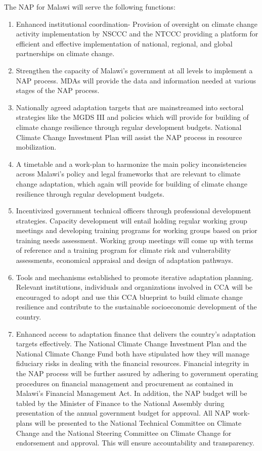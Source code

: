 \documentclass[
]{book}
\providecommand{\tightlist}{%
  \setlength{\itemsep}{0pt}\setlength{\parskip}{0pt}}
\begin{document}
The NAP for Malawi will serve the following functions:

\begin{enumerate}
\def\labelenumi{\arabic{enumi}.}
\tightlist
\item
  Enhanced institutional coordination- Provision of oversight on climate change activity implementation by NSCCC and the NTCCC providing a platform for efficient and effective implementation of national, regional, and global partnerships on climate change.
\item
  Strengthen the capacity of Malawi's government at all levels to implement a NAP process. MDAs will provide the data and information needed at various stages of the NAP process.
\item
  Nationally agreed adaptation targets that are mainstreamed into sectoral strategies like the MGDS III and policies which will provide for building of climate change resilience through regular development budgets. National Climate Change Investment Plan will assist the NAP process in resource mobilization.
\item
  A timetable and a work-plan to harmonize the main policy inconsistencies across Malawi's policy and legal frameworks that are relevant to climate change adaptation, which again will provide for building of climate change resilience through regular development budgets.
\item
  Incentivized government technical officers through professional development strategies. Capacity development will entail holding regular working group meetings and developing training programs for working groups based on prior training needs assessment. Working group meetings will come up with terms of reference and a training program for climate risk and vulnerability assessments, economical appraisal and design of adaptation pathways.
\item
  Tools and mechanisms established to promote iterative adaptation planning. Relevant institutions, individuals and organizations involved in CCA will be encouraged to adopt and use this CCA blueprint to build climate change resilience and contribute to the sustainable socioeconomic development of the country.
\item
  Enhanced access to adaptation finance that delivers the country's adaptation targets effectively. The National Climate Change Investment Plan and the National Climate Change Fund both have stipulated how they will manage fiduciary risks in dealing with the financial resources. Financial integrity in the NAP process will be further assured by adhering to government operating procedures on financial management and procurement as contained in Malawi's Financial Management Act. In addition, the NAP budget will be tabled by the Minister of Finance to the National Assembly during presentation of the annual government budget for approval. All NAP work-plans will be presented to the National Technical Committee on Climate Change and the National Steering Committee on Climate Change for endorsement and approval. This will ensure accountability and transparency.

\end{enumerate}
\end{document}
